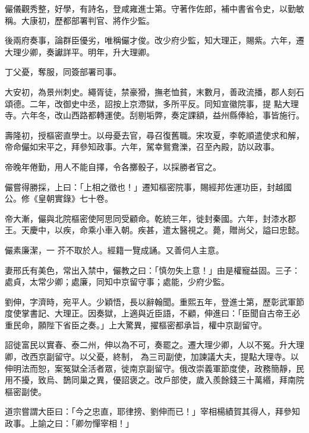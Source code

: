 \begin{pinyinscope}
 儼儀觀秀整，好學，有詩名，登咸雍進士第。守著作佐郎，補中書省令史，以勤敏稱。大康初，歷都部署判官、將作少監。



 後兩府奏事，論群臣優劣，唯稱儼才俊。改少府少監，知大理正，賜紫。六年，遷大理少卿，奏讞詳平。明年，升大理卿。



 丁父憂，奪服，同簽部署司事。



 大安初，為景州刺史。繩胥徒，禁豪猾，撫老恤貧，末數月，善政流播，郡人刻石頌德。二年，改御史中丞，詔按上京滯獄，多所平反。同知宣徽院事，提
 點大理寺。六年冬，改山西路都轉運使。刮剔垢弊，奏定課額，益州縣俸給，事皆施行。



 壽隆初，授樞密直學士。以母憂去官，尋召復舊職。宋攻夏，李乾順遣使求和解，帝命儼如宋平之，拜參知政事。六年，駕幸鴛鴦濼，召至內殿，訪以政事。



 帝晚年倦勤，用人不能自擇，令各擲骰子，以採勝者官之。



 儼嘗得勝採，上曰：「上相之徵也！」遷知樞密院事，賜經邦佐運功臣，封越國公。修《皇朝實錄》七十卷。



 帝大漸，儼與北院樞密使阿思同受顧命。乾統三年，徙封秦國。六年，封漆水郡王。天慶中，以疾，命乘小車入朝。疾甚，遣太醫視之。薨，贈尚父，謚曰忠懿。



 儼素廉潔，一
 芥不取於人。經籍一覽成誦。又善伺人主意。



 妻邢氏有美色，常出入禁中，儼教之曰：「慎勿失上意！」由是權寵益固。三子：處貞，太常少卿；處廉，同知中京留守事；處能，少府少監。



 劉伸，字濟時，宛平人。少穎悟，長以辭翰聞。重熙五年，登進士第，歷彰武軍節度使掌書記、大理正。因奏獄，上適與近臣語，不顧，伸進曰：「臣聞自古帝王必重民命，願陛下省臣之奏。」上大驚異，擢樞密都承旨，權中京副留守。



 詔徙富民以實春、泰二州，伸以為不可，奏罷之。遷大理少卿，人以不冤。升大理卿，改西京副留守。以父憂，終制，
 為三司副使，加諫議大夫，提點大理寺。以伸明法而恕，案冤獄全活者眾，徙南京副留守。俄改崇義軍節度使，政務簡靜，民用不擾，致烏、鵲同巢之異，優詔褒之。改戶部使，歲入羨餘錢三十萬緡，拜南院樞密副使。



 道宗嘗謂大臣曰：「今之忠直，耶律搒、劉伸而已！」宰相楊績賀其得人，拜參知政事。上諭之曰：「卿勿憚宰相！」




\end{pinyinscope}
